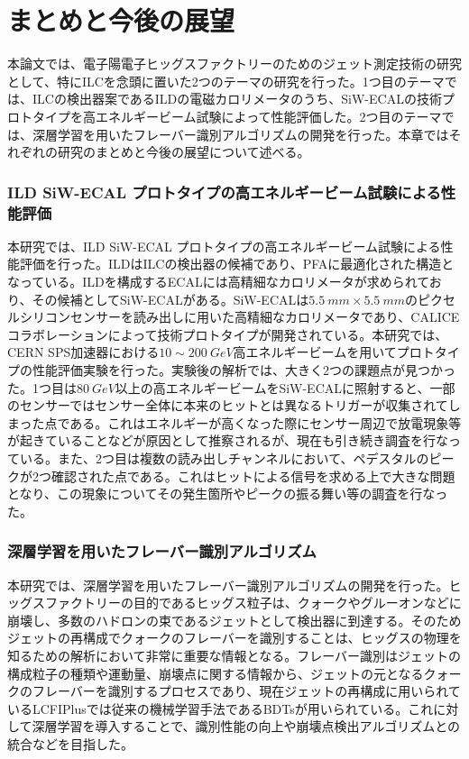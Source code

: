 
\chapter{まとめと今後の展望} \label{sec:Conclusion}
本論文では、電子陽電子ヒッグスファクトリーのためのジェット測定技術の研究として、特にILCを念頭に置いた2つのテーマの研究を行った。1つ目のテーマでは、ILCの検出器案であるILDの電磁カロリメータのうち、SiW-ECALの技術プロトタイプを高エネルギービーム試験によって性能評価した。2つ目のテーマでは、深層学習を用いたフレーバー識別アルゴリズムの開発を行った。本章ではそれぞれの研究のまとめと今後の展望について述べる。

\subsection*{ILD SiW-ECAL プロトタイプの高エネルギービーム試験による性能評価}
本研究では、ILD SiW-ECAL プロトタイプの高エネルギービーム試験による性能評価を行った。ILDはILCの検出器の候補であり、PFAに最適化された構造となっている。ILDを構成するECALには高精細なカロリメータが求められており、その候補としてSiW-ECALがある。SiW-ECALは$\SI{5.5}{mm} \times \SI{5.5}{mm}$のピクセルシリコンセンサーを読み出しに用いた高精細なカロリメータであり、CALICEコラボレーションによって技術プロトタイプが開発されている。本研究では、CERN SPS加速器における$10 \sim \SI{200}{GeV}$高エネルギービームを用いてプロトタイプの性能評価実験を行った。実験後の解析では、大きく2つの課題点が見つかった。1つ目は$\SI{80}{GeV}$以上の高エネルギービームをSiW-ECALに照射すると、一部のセンサーではセンサー全体に本来のヒットとは異なるトリガーが収集されてしまった点である。これはエネルギーが高くなった際にセンサー周辺で放電現象等が起きていることなどが原因として推察されるが、現在も引き続き調査を行なっている。また、2つ目は複数の読み出しチャンネルにおいて、ペデスタルのピークが2つ確認された点である。これはヒットによる信号を求める上で大きな問題となり、この現象についてその発生箇所やピークの振る舞い等の調査を行なった。


\subsection*{深層学習を用いたフレーバー識別アルゴリズム}
本研究では、深層学習を用いたフレーバー識別アルゴリズムの開発を行った。ヒッグスファクトリーの目的であるヒッグス粒子は、クォークやグルーオンなどに崩壊し、多数のハドロンの束であるジェットとして検出器に到達する。そのためジェットの再構成でクォークのフレーバーを識別することは、ヒッグスの物理を知るための解析において非常に重要な情報となる。フレーバー識別はジェットの構成粒子の種類や運動量、崩壊点に関する情報から、ジェットの元となるクォークのフレーバーを識別するプロセスであり、現在ジェットの再構成に用いられているLCFIPlusでは従来の機械学習手法であるBDTsが用いられている。これに対して深層学習を導入することで、識別性能の向上や崩壊点検出アルゴリズムとの統合などを目指した。

